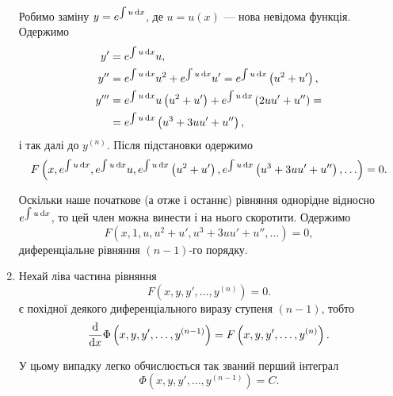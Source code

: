 \begin{enumerate}
    Робимо заміну $y = e^{\int u \mathop{}\!\mathrm{d} x}$, де $u=u(x)$ --- нова невідома функція. Одержимо
    \begin{align*}
    	y' &= e^{\int u \mathop{}\!\mathrm{d} x} u, \\
    	y^{\prime\prime} &= e^{\int u \mathop{}\!\mathrm{d} x}  u^2 + e^{\int u \mathop{}\!\mathrm{d} x} u' = e^{\int u \mathop{}\!\mathrm{d} x} \left(u^2 + u'\right), \\
    	y^{\prime\prime\prime} &= e^{\int u \mathop{}\!\mathrm{d} x} u \left( u^2 + u' \right) + e^{\int u \mathop{}\!\mathrm{d} x}  \left(2 u u' + u''\right) = \\ 
    	&= e^{\int u \mathop{}\!\mathrm{d} x} \left( u^3 + 3 u u' + u'' \right), \nonumber
    \end{align*}
    і так далі до $y^{(n)}$. Після підстановки одержимо
    \begin{equation*}
    	F \left( x, e^{\int u \mathop{}\!\mathrm{d} x}, e^{\int u \mathop{}\!\mathrm{d} x} u, e^{\int u \mathop{}\!\mathrm{d} x} \left(u^2 + u'\right), e^{\int u \mathop{}\!\mathrm{d} x} \left( u^3 + 3 u u' + u'' \right), \ldots \right) = 0.
    \end{equation*}
    
    Оскільки наше початкове (а отже і останнє) рівняння однорідне відносно $e^{\int u\mathop{}\!\mathrm{d} x}$, то цей член можна винести і на нього скоротити. Одержимо
    \begin{equation*}
    	F \left( x, 1, u, u^2 + u', u^3 + 3 u u' + u'', \ldots \right) = 0,
    \end{equation*} 
    диференціальне рівняння $(n-1)$-го порядку. 
    
    \item Нехай ліва частина рівняння
    \begin{equation*}
    	F \left( x, y, y', \ldots, y^{(n)} \right) = 0.
    \end{equation*}
    є похідної деякого диференціального виразу ступеня $(n-1)$, тобто
    \begin{equation*}
    	\frac{\mathop{}\!\mathrm{d}}{\mathop{}\!\mathrm{d} x}  \Phi\left( x, y, y', \ldots, y^{(n-1)} \right) = F \left( x, y, y', \ldots, y^{(n)} \right).
    \end{equation*}
    
    У цьому випадку легко обчислюється так званий перший інтеграл
    \begin{equation*}
    	\Phi\left( x, y, y', \ldots, y^{(n-1)} \right) = C.
    \end{equation*}
    

\end{enumerate}

